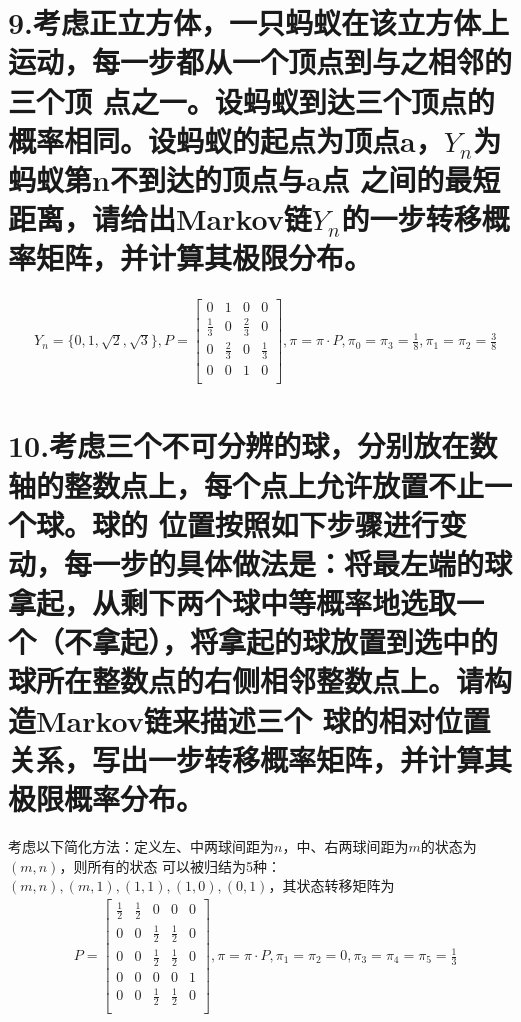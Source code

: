 \documentclass[UTF8]{ctexart}
\begin{document}
\section*{9.考虑正立方体，一只蚂蚁在该立方体上运动，每一步都从一个顶点到与之相邻的三个顶
  点之一。设蚂蚁到达三个顶点的概率相同。设蚂蚁的起点为顶点a，$Y_n$为蚂蚁第n不到达的顶点与a点
  之间的最短距离，请给出Markov链$Y_n$的一步转移概率矩阵，并计算其极限分布。}
\begin{equation*}
  \begin{aligned}
     & Y_n=\{0,1,\sqrt2,\sqrt3\},P=\begin{bmatrix}
      0           & 1           & 0           & 0           \\
      \frac{1}{3} & 0           & \frac{2}{3} & 0           \\
      0           & \frac{2}{3} & 0           & \frac{1}{3} \\
      0           & 0           & 1           & 0           \\
    \end{bmatrix},
    \pi=\pi\cdot P,\pi_0=\pi_3=\frac{1}{8},\pi_1=\pi_2=\frac{3}{8}
  \end{aligned}
\end{equation*}
\section*{10.考虑三个不可分辨的球，分别放在数轴的整数点上，每个点上允许放置不止一个球。球的
  位置按照如下步骤进行变动，每一步的具体做法是：将最左端的球拿起，从剩下两个球中等概率地选取一
  个（不拿起），将拿起的球放置到选中的球所在整数点的右侧相邻整数点上。请构造Markov链来描述三个
  球的相对位置关系，写出一步转移概率矩阵，并计算其极限概率分布。}
考虑以下简化方法：定义左、中两球间距为$n$，中、右两球间距为$m$的状态为$(m,n)$，则所有的状态
可以被归结为5种：$(m,n),(m,1),(1,1),(1,0),(0,1)$，其状态转移矩阵为
\begin{equation*}
  \begin{aligned}
     & P=\begin{bmatrix}
      \frac{1}{2} & \frac{1}{2} & 0           & 0           & 0 \\
      0           & 0           & \frac{1}{2} & \frac{1}{2} & 0 \\
      0           & 0           & \frac{1}{2} & \frac{1}{2} & 0 \\
      0           & 0           & 0           & 0           & 1 \\
      0           & 0           & \frac{1}{2} & \frac{1}{2} & 0 \\
    \end{bmatrix},
    \pi=\pi\cdot P,\pi_1=\pi_2=0,\pi_3=\pi_4=\pi_5=\frac{1}{3} \\
  \end{aligned}
\end{equation*}
\end{document}
